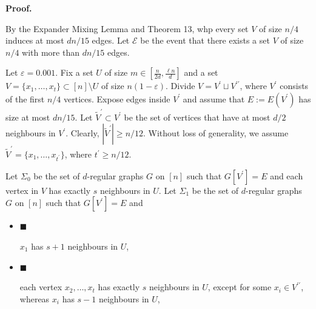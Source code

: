 



\par\medskip\noindent\textbf{Proof.}\par




By the Expander Mixing Lemma and Theorem 13, whp every set $V$ of size $n/4$ induces at most $dn/15$ edges. Let $\mathcal{E}$ be the event that there exists a set $V$ of size $n/4$ with more than $dn/15$ edges.\par




Let $\varepsilon=0.001$. Fix a set $U$ of size $m\in[\frac{n}{2d},\frac{\ell n}{d}]$ and a set $V=\{x_{1},\ldots,x_{t}\}\subset[n]\setminus U$ of size $n(1-\varepsilon)$. Divide $V=V^{\prime}\sqcup V^{\prime\prime}$, where $V^{\prime}$ consists of the first $n/4$ vertices. Expose edges inside $V^{\prime}$ and assume that $E:=E(V^{\prime})$ has size at most $dn/15$. Let $\tilde{V}^{\prime}\subset V^{\prime}$ be the set of vertices that have at most $d/2$ neighbours in $V^{\prime}$. Clearly, $|\tilde{V}^{\prime}|\geq n/12$. Without loss of generality, we assume $\tilde{V}^{\prime}=\{x_{1},\ldots,x_{t^{\prime}}\}$, where $t^{\prime}\geq n/12$.\par




Let $\Sigma_{0}$ be the set of $d$-regular graphs $G$ on $[n]$ such that $G[V^{\prime}]=E$ and each vertex in $V$ has exactly $s$ neighbours in $U$.
Let $\Sigma_{1}$ be the set of $d$-regular graphs $G$ on $[n]$ such that $G[V^{\prime}]=E$ and\par


\begin{itemize}


\item[] 
$\blacksquare$ 


$x_{1}$ has $s+1$ neighbours in $U$,\par





\item[] 
$\blacksquare$ 


each vertex $x_{2},\ldots,x_{t}$ has exactly $s$ neighbours in $U$, except for some $x_{i}\in V^{\prime\prime}$, whereas $x_{i}$ has $s-1$ neighbours in $U$,\par





\end{itemize}


